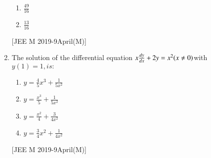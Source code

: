\documentclass[journal,12pt,twocolumn]{IEEEtran}
\theoremstyle{remark}
\begin{document}
\begin{enumerate}
\begin{enumerate}
    
    \item $ \frac{49}{16}$
    
    \item $ \frac{13}{16}$
    
    
\end{enumerate}
\hfill
{[JEE M 2019-9April(M)]}
\item The solution of the differential equation $ x\frac{d{y}}{d{x}}+2y=x^2 (x\neq0)$with$ y(1)=1,is:$
\begin{enumerate}
    \item $ y=\frac{4}{5}x^3+\frac{1}{5x^2}$

\item $ y=\frac{x^3}{5}+\frac{1}{5x^2}$
\item $ y=\frac{x^2}{4}+\frac{3}{4x^2}$
\item $ y=\frac{3}{4}x^2+\frac{1}{4x^2}$
\end{enumerate}
\hfill
{[JEE M 2019-9April(M)]}















\end{enumerate}
\end{document}
